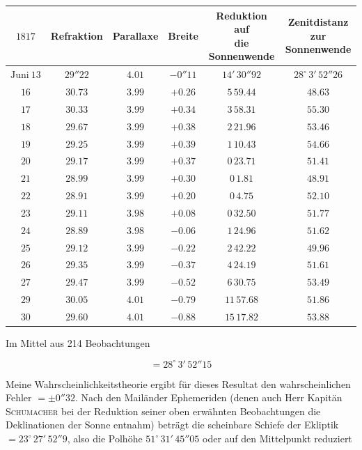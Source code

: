 \begin{center}\fontsize{9}{11}\selectfont\setlength{\tabcolsep}{3pt}\begin{tabular}{c|c|c|c|c|c}
$1817$ & Refraktion & Parallaxe & Breite & \shortstack{Reduktion auf\\die Sonnenwende} & \shortstack{Zenitdistanz zur\\Sonnenwende}\\
\hline$\text{Juni}\ 13$ & $29''22$ & $4.01$ & $-0''11$ & $14'\,30''92$ & $28^\circ\,3'\,52''26$\\
$16$ & $30.73$ & $3.99$ & $+0.26$ & $5\,59.44$ & $48.63$\\
$17$ & $30.33$ & $3.99$ & $+0.34$ & $3\,58.31$ & $55.30$\\
$18$ & $29.67$ & $3.99$ & $+0.38$ & $2\,21.96$ & $53.46$\\
$19$ & $29.25$ & $3.99$ & $+0.39$ & $1\,10.43$ & $54.66$\\
$20$ & $29.17$ & $3.99$ & $+0.37$ & $0\,23.71$ & $51.41$\\
$21$ & $28.99$ & $3.99$ & $+0.30$ & $0\,1.81$ & $48.91$\\
$22$ & $28.91$ & $3.99$ & $+0.20$ & $0\,4.75$ & $52.10$\\
$23$ & $29.11$ & $3.98$ & $+0.08$ & $0\,32.50$ & $51.77$\\
$24$ & $28.89$ & $3.98$ & $-0.06$ & $1\,24.96$ & $51.62$\\
$25$ & $29.12$ & $3.99$ & $-0.22$ & $2\,42.22$ & $49.96$\\
$26$ & $29.35$ & $3.99$ & $-0.37$ & $4\,24.19$ & $51.61$\\
$27$ & $29.47$ & $3.99$ & $-0.52$ & $6\,30.75$ & $53.49$\\
$29$ & $30.05$ & $4.01$ & $-0.79$ & $11\,57.68$ & $51.86$\\
$30$ & $29.60$ & $4.01$ & $-0.88$ & $15\,17.82$ & $53.88$\\
\end{tabular}\end{center}

\par\indent Im Mittel aus 214 Beobachtungen

\[ = 28^\circ\,3'\,52''15 \]

\par\indent Meine Wahrscheinlichkeitstheorie ergibt für dieses Resultat den wahrscheinlichen Fehler $= \pm 0''32$. Nach den Mailänder Ephemeriden (denen auch Herr Kapitän \textsc{Schumacher} bei der Reduktion seiner oben erwähnten Beobachtungen die Deklinationen der Sonne entnahm) beträgt die scheinbare Schiefe der Ekliptik $= 23^\circ\,27'\,52''9$, also die Polhöhe $51^\circ\,31'\,45''05$ oder auf den Mittelpunkt reduziert

